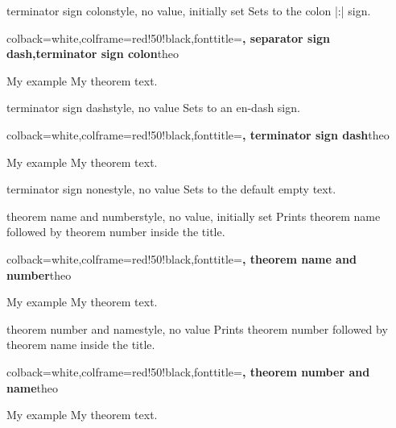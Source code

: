 \clearpage
\begin{docTcbKey}{terminator sign colon}{}{style, no value, initially set}
Sets  to the colon |:| sign.
\begin{dispExample}
%
  {colback=white,colframe=red!50!black,fonttitle=\bfseries,
   separator sign dash,terminator sign colon}{theo}
\begin{sometheorem}{My example}{}
My theorem text.
\end{sometheorem}
\end{dispExample}
\end{docTcbKey}

\begin{docTcbKey}{terminator sign dash}{}{style, no value}
Sets  to an en-dash sign.
\begin{dispExample}
%
  {colback=white,colframe=red!50!black,fonttitle=\bfseries,
   terminator sign dash}{theo}
\begin{sometheorem}{My example}{}
My theorem text.
\end{sometheorem}
\end{dispExample}
\end{docTcbKey}

\begin{docTcbKey}{terminator sign none}{}{style, no value}
Sets  to the default empty text.
\end{docTcbKey}


\begin{docTcbKey}{theorem name and number}{}{style, no value, initially set}
Prints theorem name followed by theorem number inside the title.
\begin{dispExample}
%
  {colback=white,colframe=red!50!black,fonttitle=\bfseries,
   theorem name and number}{theo}
\begin{sometheorem}{My example}{}
My theorem text.
\end{sometheorem}
\end{dispExample}
\end{docTcbKey}

\clearpage
\begin{docTcbKey}{theorem number and name}{}{style, no value}
Prints theorem number followed by theorem name inside the title.
\begin{dispExample}
%
  {colback=white,colframe=red!50!black,fonttitle=\bfseries,
   theorem number and name}{theo}
\begin{sometheorem}{My example}{}
My theorem text.
\end{sometheorem}
\end{dispExample}
\end{docTcbKey}

